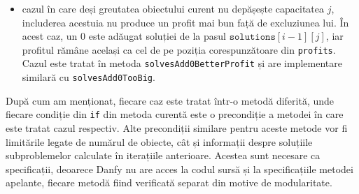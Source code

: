 \begin{sloppypar}
\begin{itemize}
\begin{Verbatim}[commandchars=\\\{\}]
\PY{n}{currentSolution} \PY{o}{:=} \PY{n}{currentSolution} \PY{o}{+} \PY{p}{[}\PY{l+m+mi}{1}\PY{p}{]}\PY{p}{;}
\end{Verbatim}
        Acest caz este tratat în metoda \texttt{solvesAdd1BetterProfit}.
        \item cazul în care deși greutatea obiectului curent nu depășește capacitatea $j$, includerea acestuia nu produce un profit mai bun față de excluziunea lui. În acest caz, un 0 este adăugat soluției de la pasul $\texttt{solutions}[i - 1][j]$, iar profitul rămâne același ca cel de pe poziția corespunzătoare din \texttt{profits}. Cazul este tratat în metoda \texttt{solvesAdd0BetterProfit} și are implementare similară cu \texttt{solvesAdd0TooBig}.
    \end{itemize}
    După cum am menționat, fiecare caz este tratat într-o metodă diferită, unde fiecare condiție din \texttt{if} din metoda curentă este o precondiție a metodei în care este tratat cazul respectiv. Alte precondiții similare pentru aceste metode vor fi limitările legate de numărul de obiecte, cât și informații despre soluțiile subproblemelor calculate în iterațiile anterioare. Acestea sunt necesare ca specificații, deoarece Danfy nu are acces la codul sursă și la specificațiile metodei apelante, fiecare metodă fiind verificată separat din motive de modularitate.

\end{sloppypar}